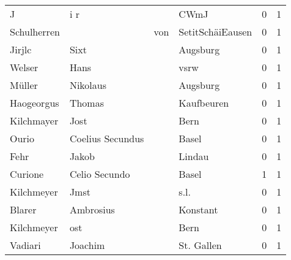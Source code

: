 \documentclass[10pt,a4paper,landscape]{article}
\begin{document}
\begin{longtable}{llllrr}
                        J &                                i r &             &                                        CWmJ &          0 &         1 \\
              Schulherren &                                    &         von &                            SetitSchäiEausen &          0 &         1 \\
                   Jirjlc &                               Sixt &             &                                    Augsburg &          0 &         1 \\
                   Welser &                               Hans &             &                                        vsrw &          0 &         1 \\
                   Müller &                           Nikolaus &             &                                    Augsburg &          0 &         1 \\
               Haogeorgus &                             Thomas &             &                                  Kaufbeuren &          0 &         1 \\
               Kilchmayer &                               Jost &             &                                        Bern &          0 &         1 \\
                    Ourio &                   Coelius Secundus &             &                                       Basel &          0 &         1 \\
                     Fehr &                              Jakob &             &                                      Lindau &          0 &         1 \\
                  Curione &                      Celio Secundo &             &                                       Basel &          1 &         1 \\
               Kilchmeyer &                               Jmst &             &                                        s.l. &          0 &         1 \\
                   Blarer &                          Ambrosius &             &                                    Konstant &          0 &         1 \\
               Kilchmeyer &                                ost &             &                                        Bern &          0 &         1 \\
                  Vadiari &                            Joachim &             &                                  St. Gallen &          0 &         1 \\

\end{longtable}
\end{document}
